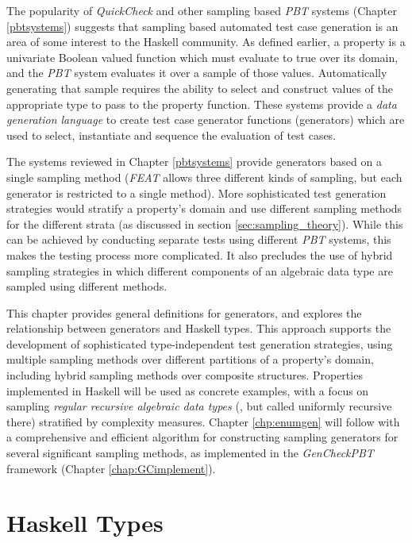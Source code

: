 \documentclass[11pt]{report}
\newcommand{\pbt}{\textit{PBT}\xspace}
\newcommand{\GC}{\textit{GenCheck}\xspace}
\newcommand{\QC}{\textit{QuickCheck}\xspace}
\newcommand{\FEAT}{\textit{FEAT}\xspace}
\begin{document}
The popularity of \QC and other sampling based \pbt systems (Chapter \ref{pbtsystems})
suggests that sampling based automated test case generation
is an area of some interest to the Haskell community.
As defined earlier, 
a property is a univariate Boolean valued function
which must evaluate to true over its domain,
and the \pbt system evaluates it over a sample of those values.
Automatically generating that sample requires the ability to 
select and construct values of the appropriate type
to pass to the property function.
These systems provide a \emph{data generation language} to 
create test case generator functions (generators)
which are used to select, instantiate and sequence the evaluation of test cases.

The systems reviewed in Chapter \ref{pbtsystems}  
provide generators based on a single sampling method
(\FEAT allows three different kinds of sampling, but each generator is restricted to a single method).
More sophisticated test generation strategies
would stratify a property's domain and use different sampling methods for the different strata
(as discussed in section \ref{sec:sampling_theory}).
While this can be achieved by conducting separate tests using different \pbt systems,
this makes the testing process more complicated.
It also precludes the use of hybrid sampling strategies
in which different components of an algebraic data type are 
sampled using different methods.

This chapter provides general definitions for generators,
and explores the relationship between generators and Haskell types.
This approach supports the development of 
sophisticated type-independent test generation strategies,
using multiple sampling methods over different partitions of a property's domain,
including hybrid sampling methods over composite structures.
Properties implemented in Haskell will be used as concrete examples,
with a focus on sampling \emph{regular recursive algebraic data types} 
(\cite{Okasaki1998}, but called uniformly recursive there)
stratified by complexity measures.
Chapter \ref{chp:enumgen} will follow with a comprehensive and efficient algorithm for constructing
sampling generators for several significant sampling methods,
as implemented in the \GC \pbt framework (Chapter \ref{chap:GCimplement}).

\section{Haskell Types}\label{algdatatype}

\end{document}
